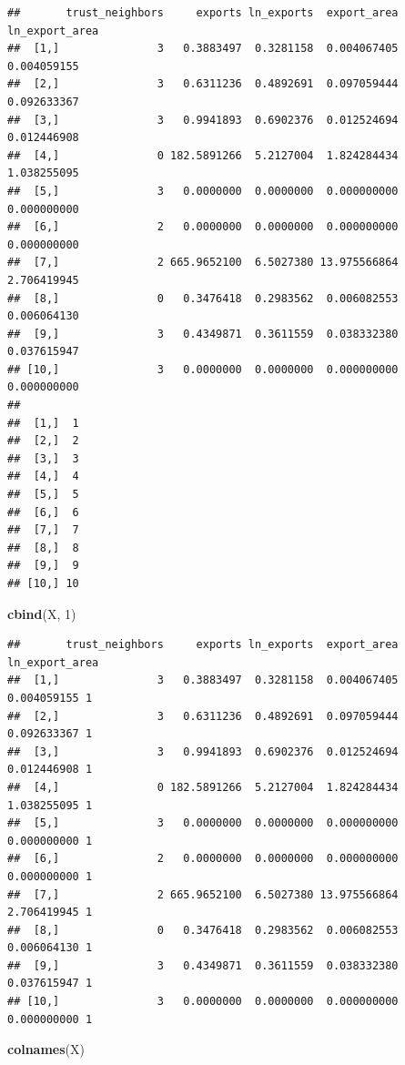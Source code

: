 \documentclass[]{book}
\newenvironment{Shaded}{\begin{snugshade}}{\end{snugshade}}
\newcommand{\DecValTok}[1]{\textcolor[rgb]{0.00,0.00,0.81}{#1}}
\newcommand{\KeywordTok}[1]{\textcolor[rgb]{0.13,0.29,0.53}{\textbf{#1}}}
\newcommand{\NormalTok}[1]{#1}
\theoremstyle{definition}
\theoremstyle{definition}
\theoremstyle{definition}
\theoremstyle{remark}
\begin{document}
\begin{verbatim}
##       trust_neighbors     exports ln_exports  export_area ln_export_area
##  [1,]               3   0.3883497  0.3281158  0.004067405    0.004059155
##  [2,]               3   0.6311236  0.4892691  0.097059444    0.092633367
##  [3,]               3   0.9941893  0.6902376  0.012524694    0.012446908
##  [4,]               0 182.5891266  5.2127004  1.824284434    1.038255095
##  [5,]               3   0.0000000  0.0000000  0.000000000    0.000000000
##  [6,]               2   0.0000000  0.0000000  0.000000000    0.000000000
##  [7,]               2 665.9652100  6.5027380 13.975566864    2.706419945
##  [8,]               0   0.3476418  0.2983562  0.006082553    0.006064130
##  [9,]               3   0.4349871  0.3611559  0.038332380    0.037615947
## [10,]               3   0.0000000  0.0000000  0.000000000    0.000000000
##         
##  [1,]  1
##  [2,]  2
##  [3,]  3
##  [4,]  4
##  [5,]  5
##  [6,]  6
##  [7,]  7
##  [8,]  8
##  [9,]  9
## [10,] 10
\end{verbatim}

\begin{Shaded}
\begin{Highlighting}[]
\KeywordTok{cbind}\NormalTok{(X, }\DecValTok{1}\NormalTok{)}
\end{Highlighting}
\end{Shaded}

\begin{verbatim}
##       trust_neighbors     exports ln_exports  export_area ln_export_area  
##  [1,]               3   0.3883497  0.3281158  0.004067405    0.004059155 1
##  [2,]               3   0.6311236  0.4892691  0.097059444    0.092633367 1
##  [3,]               3   0.9941893  0.6902376  0.012524694    0.012446908 1
##  [4,]               0 182.5891266  5.2127004  1.824284434    1.038255095 1
##  [5,]               3   0.0000000  0.0000000  0.000000000    0.000000000 1
##  [6,]               2   0.0000000  0.0000000  0.000000000    0.000000000 1
##  [7,]               2 665.9652100  6.5027380 13.975566864    2.706419945 1
##  [8,]               0   0.3476418  0.2983562  0.006082553    0.006064130 1
##  [9,]               3   0.4349871  0.3611559  0.038332380    0.037615947 1
## [10,]               3   0.0000000  0.0000000  0.000000000    0.000000000 1
\end{verbatim}

\begin{Shaded}
\begin{Highlighting}[]
\KeywordTok{colnames}\NormalTok{(X)}
\end{Highlighting}
\end{Shaded}
\end{document}
